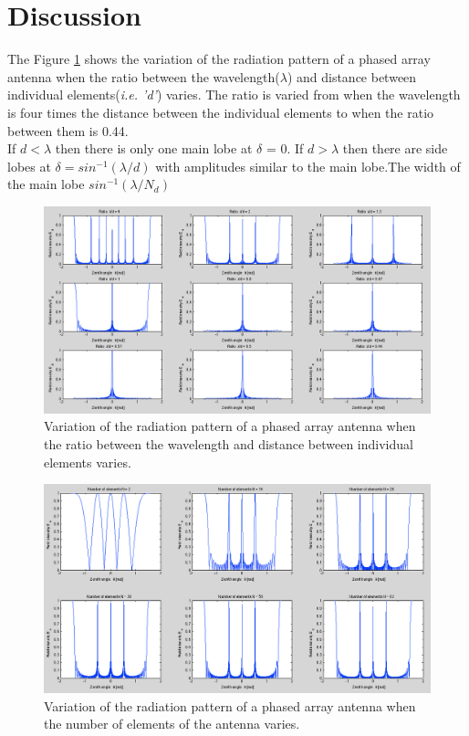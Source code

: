\documentclass{article}
\begin{document}

\section{Discussion}

The Figure \ref{fig:ratio} shows the variation of the radiation pattern of a phased array antenna when the ratio between the wavelength(\textit{$\lambda$}) and distance between individual elements(\textit{i.e. 'd'}) varies. The ratio is varied from when the wavelength is four times the distance between the individual elements to when the ratio between them is 0.44. \\
If $d<\lambda$ then there is only one main lobe at $\delta$ = 0. If $d>\lambda$ then there are side lobes at $\delta = sin^{-1}(\lambda/d)$ with amplitudes similar to the main lobe.The width of the main lobe $sin^{-1}(\lambda/N_{d})$

\begin{figure}[tbh]
\centering
\includegraphics[width=\textwidth]{Figures/ratio.png}
\caption{Variation of the radiation pattern of a phased array antenna when the ratio between the wavelength and distance between individual elements varies.}
\label{fig:ratio}
\end{figure}

\begin{figure}[tbh]
\centering
\includegraphics[width=\textwidth]{Figures/elements.png}
\caption{Variation of the radiation pattern of a phased array antenna when the number of elements of the antenna varies.}
\label{fig:elements}
\end{figure}
\end{document}
